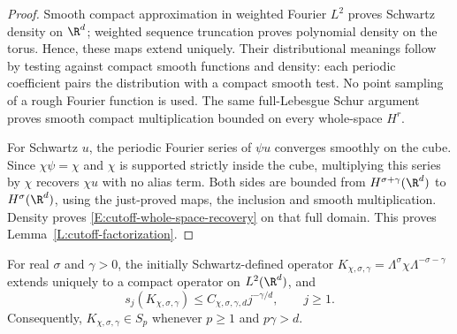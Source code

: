 \begin{proof}
  Smooth compact approximation in weighted Fourier $L^2$ proves Schwartz
  density on $\R^d$; weighted sequence truncation proves polynomial density
  on the torus. Hence, these maps extend uniquely. Their distributional
  meanings follow by testing against compact smooth functions and density:
  each periodic coefficient pairs the distribution with a compact smooth
  test. No point sampling of a rough Fourier function is used. The same
  full-Lebesgue Schur argument proves smooth compact multiplication bounded
  on every whole-space $H^r$.

  For Schwartz $u$, the periodic Fourier series of $\psi u$ converges
  smoothly on the cube. Since $\chi\psi=\chi$ and $\chi$ is supported
  strictly inside the cube, multiplying this series by $\chi$ recovers
  $\chi u$ with no alias term. Both sides are bounded from
  $H^{\sigma+\gamma}(\R^d)$ to $H^\sigma(\R^d)$, using the just-proved
  maps, the inclusion and smooth multiplication. Density proves
  \eqref{E:cutoff-whole-space-recovery} on that full domain.
  This proves Lemma~\ref{L:cutoff-factorization}.
\end{proof}

\begin{proposition}\label{P:cutoff-singular-values}
  For real $\sigma$ and $\gamma > 0$, the initially Schwartz-defined
  operator $K_{\chi,\sigma,\gamma}=\Lambda^\sigma\chi\Lambda^{-\sigma-\gamma}$
  extends uniquely to a compact operator on $L^2(\R^d)$, and
  \begin{equation}\label{E:cutoff-singular-values}
    s_j(K_{\chi,\sigma,\gamma})
    \le C_{\chi,\sigma,\gamma,d}j^{-\gamma/d},\qquad j \ge 1.
  \end{equation}
  Consequently, $K_{\chi,\sigma,\gamma}\in S_p$ whenever $p \ge 1$
  and $p\gamma > d$.
\end{proposition}

